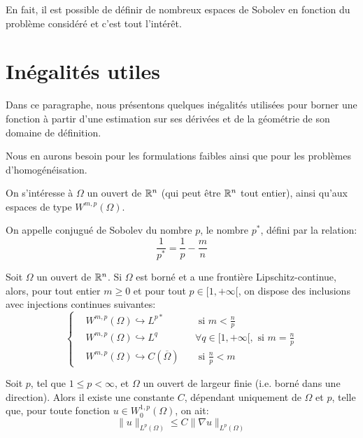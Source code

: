 \medskip
En fait, il est possible de définir de nombreux espaces de Sobolev en fonction du problème considéré et c'est tout l'intérêt.

\medskip
\section{Inégalités utiles}
Dans ce paragraphe, nous présentons quelques inégalités utilisées pour borner une fonction à partir d'une estimation sur
ses dérivées et de la géométrie de son domaine de définition.

Nous en aurons besoin pour les formulations faibles ainsi que pour les problèmes d'homogénéisation.
\medskip
\begin{definition}
On s'intéresse à $\Omega$ un ouvert de $\mathbb R^n$ (qui peut être $\mathbb R^n$ tout entier), ainsi qu'aux
espaces de type $W^{m,p}(\Omega)$.

On appelle conjugué de Sobolev du nombre $p$, le nombre $p^*$, défini par la relation:
\begin{equation}
    \frac{1}{p^*} = \frac{1}{p} - \frac{m}{n}
\end{equation}
\end{definition}
\begin{theoreme}
Soit $\Omega$ un  ouvert de $\mathbb R^n$. Si $\Omega$ est borné et a une frontière Lipschitz-continue,
alors, pour tout entier $m\ge 0$ et pour tout $p\in[1,+\infty[$, on dispose des inclusions avec injections continues
suivantes:
\begin{equation}
\left\{\begin{aligned}
&W^{m,p}(\Omega) \hookrightarrow L^{p*} && \text{ si } m<\frac{n}p\\
&W^{m,p}(\Omega) \hookrightarrow L^q && \forall q\in[1,+\infty[, \text{ si } m=\frac{n}p\\
&W^{m,p}(\Omega) \hookrightarrow C(\overline{\Omega}) && \text{ si } \frac{n}p<m
\end{aligned}\right.
\end{equation}
\end{theoreme}


\medskip

\begin{theoreme}
Soit $p$, tel que $1 \le p <\infty$, et $\Omega$ un ouvert de largeur finie
(i.e. borné dans une direction).
Alors il existe une constante $C$, dépendant uniquement de $\Omega$ et $p$, telle que,
pour toute fonction $u\in W_0^{1,p}(\Omega)$, on ait:
\begin{equation}
\|u\|_{L^p(\Omega)} \le C \|\nabla u\|_{L^p(\Omega)}
\end{equation}
\end{theoreme}

